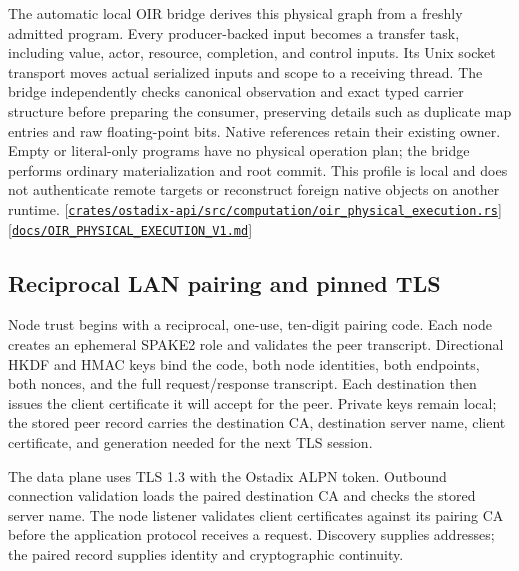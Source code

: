 \documentclass[11pt,oneside]{article}
\newcommand{\src}[1]{\textcolor{OSlate}{\scriptsize[\href{https://github.com/lostadi/OSTADIX/blob/c0b02c326b2329a95ba52447c7180bc93957cd57/#1}{\nolinkurl{#1}}]}\allowbreak}
\begin{document}
The automatic local OIR bridge derives this physical graph from a freshly
admitted program. Every producer-backed input becomes a transfer task,
including value, actor, resource, completion, and control inputs. Its Unix
socket transport moves actual serialized inputs and scope to a receiving
thread. The bridge independently checks canonical observation and exact
typed carrier structure before preparing the consumer, preserving details
such as duplicate map entries and raw floating-point bits. Native references
retain their existing owner. Empty or literal-only programs have no physical
operation plan; the bridge performs ordinary materialization and root commit.
This profile is local and does not authenticate remote targets or reconstruct
foreign native objects on another runtime.
\src{crates/ostadix-api/src/computation/oir_physical_execution.rs}
\src{docs/OIR_PHYSICAL_EXECUTION_V1.md}

\subsection{Reciprocal LAN pairing and pinned TLS}
\label{sec:pairing}

Node trust begins with a reciprocal, one-use, ten-digit pairing code. Each node
creates an ephemeral SPAKE2 role and validates the peer transcript. Directional
HKDF and HMAC keys bind the code, both node identities, both endpoints, both
nonces, and the full request/response transcript. Each destination then issues
the client certificate it will accept for the peer. Private keys remain local;
the stored peer record carries the destination CA, destination server name,
client certificate, and generation needed for the next TLS session.

The data plane uses TLS 1.3 with the Ostadix ALPN token. Outbound connection
validation loads the paired destination CA and checks the stored server name.
The node listener validates client certificates against its pairing CA before
the application protocol receives a request. Discovery supplies addresses;
the paired record supplies identity and cryptographic continuity.
\end{document}
